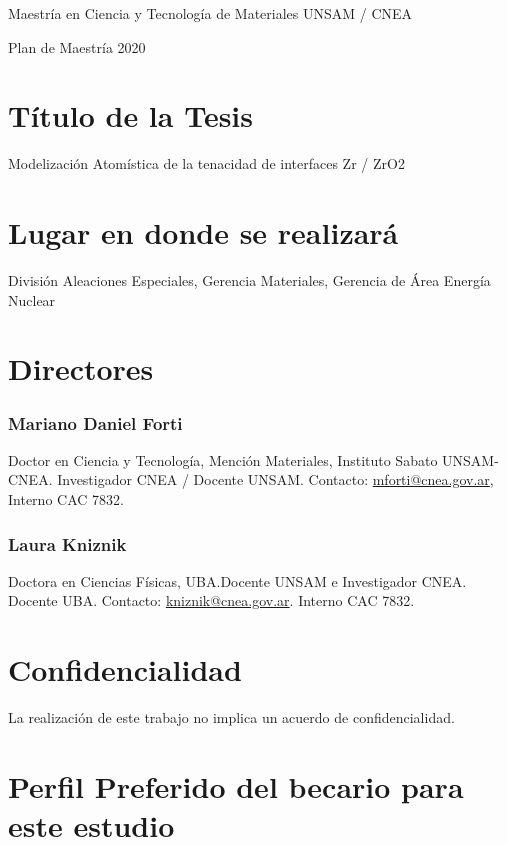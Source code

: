 \begin{center}

Maestría en Ciencia y Tecnología de Materiales UNSAM / CNEA

Plan de Maestría 2020

\end{center}

\section{ Título de la Tesis }

Modelización Atomística de la tenacidad de interfaces Zr / ZrO2

\section{ Lugar en donde se realizará }
División Aleaciones Especiales, Gerencia Materiales, Gerencia de Área Energía 
Nuclear

\section{Directores}

\subsubsection{Mariano Daniel Forti}

Doctor en Ciencia y Tecnología, Mención Materiales, Instituto Sabato 
UNSAM-CNEA. Investigador CNEA / Docente UNSAM. 
Contacto: \href{mailto:mforti@cnea.gov.ar}{mforti@cnea.gov.ar}, Interno CAC 7832.

\subsubsection{Laura Kniznik}

Doctora en Ciencias Físicas, UBA.Docente UNSAM e Investigador CNEA. Docente UBA.
Contacto: \href{mailto:kniznik@cnea.gov.ar}{kniznik@cnea.gov.ar}. Interno CAC 7832.

\section{Confidencialidad}

La realización de este trabajo no implica un acuerdo de confidencialidad.

\section{Perfil Preferido del becario para este estudio}

